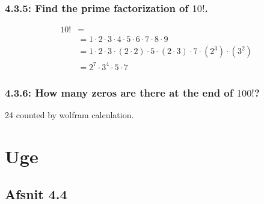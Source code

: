\documentclass[12pt, a4paper]{report}
\begin{document}
				\subsection{4.3.5: Find the prime factorization of $10!$.}
					\begin{align*}
						10!&=\\
						   &=1\cdot 2\cdot 3\cdot 4\cdot 5\cdot 6\cdot 7 \cdot 8 \cdot 9\\
						   &=1\cdot 2 \cdot 3 \cdot (2\cdot 2)\cdot 5 \cdot (2\cdot 3) \cdot 7 \cdot (2^3) \cdot (3^2)\\
						   &=2^7\cdot 3^4 \cdot 5 \cdot 7
					\end{align*}
				\subsection{4.3.6: How many zeros are there at the end of $100!$?}
					24 counted by wolfram calculation.	
		\chapter{Uge}
			\section{Afsnit 4.4}
				\setcounter{subsection}{20}
\end{document}
